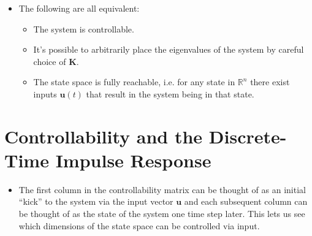 \documentclass{article}
\renewcommand{\vec}[1]{\boldsymbol{\mathbf{#1}}}
\begin{document}
\begin{itemize}
  \item The following are all equivalent:

        \begin{itemize}
          \item The system is controllable.

          \item It's possible to arbitrarily place the eigenvalues of the system by careful choice of $\vec{K}$.

          \item The state space is fully reachable, i.e. for any state in $\mathbb{R}^n$ there exist inputs $\vec{u}(t)$ that result in the system being in that state.
        \end{itemize}
\end{itemize}

\section{Controllability and the Discrete-Time Impulse Response}

\begin{itemize}
  \item The first column in the controllability matrix can be thought of as an initial ``kick'' to the system via the input vector $\vec{u}$ and each subsequent column can be thought of as the state of the system one time step later. This lets us see which dimensions of the state space can be controlled via input.
\end{itemize}
\end{document}
